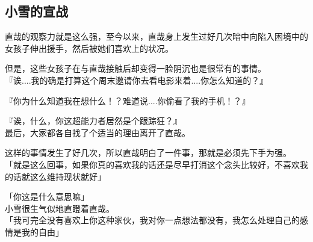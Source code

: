 \subsection{小雪的宣战}

直哉的观察力就是这么强，至今以来，直哉身上发生过好几次暗中向陷入困境中的女孩子伸出援手，然后被她们喜欢上的状况。

但是，这些女孩子在与直哉接触后却变得一脸阴沉也是很常有的事情。\\

『诶....我的确是打算这个周末邀请你去看电影来着....你怎么知道的？』

『你为什么知道我在想什么！？难道说....你偷看了我的手机！？』

『诶，什么，你这超能力者居然是个跟踪狂？』\\

最后，大家都各自找了个适当的理由离开了直哉。

这样的事情发生了好几次，所以直哉明白了一件事，那就是必须先下手为强。\\

「就是这么回事，如果你真的喜欢我的话还是尽早打消这个念头比较好，不喜欢我的话就这么维持现状就好」

「你这是什么意思嘛」\\

小雪很生气似地直瞪着直哉。\\

「我可完全没有喜欢上你这种家伙，我对你一点想法都没有，我怎么处理自己的感情是我的自由」

